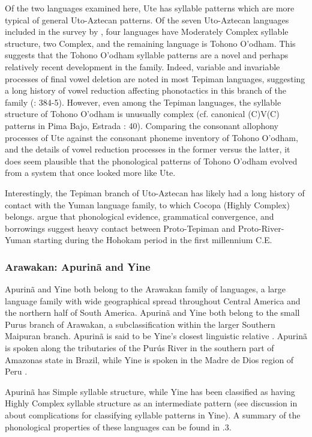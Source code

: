   Of the two languages examined here, Ute has syllable patterns which are more typical of general Uto-Aztecan patterns. Of the seven Uto-Aztecan languages included in the survey by \citet{Maddieson2013a}, four languages have Moderately Complex syllable structure, two Complex, and the remaining language is Tohono O’odham. This suggests that the Tohono O’odham syllable patterns are a novel and perhaps relatively recent development in the family. Indeed, variable and invariable processes of final vowel deletion are noted in most Tepiman languages, suggesting a long history of vowel reduction affecting phonotactics in this branch of the family (\citealt{ShaulHill1998}: 384-5). However, even among the Tepiman languages, the syllable structure of Tohono O’odham is unusually complex (cf. canonical (C)V(C) patterns in Pima Bajo, Estrada \citealt{Fernández2014}: 40). Comparing the consonant allophony processes of Ute against the consonant phoneme inventory of Tohono O’odham, and the details of vowel reduction processes in the former versus the latter, it does seem plausible that the phonological patterns of Tohono O’odham evolved from a system that once looked more like Ute.

  Interestingly, the Tepiman branch of Uto-Aztecan has likely had a long history of contact with the Yuman language family, to which Cocopa (Highly Complex) belongs. \citet{ShaulHill1998} argue that phonological evidence, grammatical convergence, and borrowings suggest heavy contact between Proto-Tepiman and Proto-River-Yuman starting during the Hohokam period in the first millennium C.E.

\subsubsection{{Arawakan:} {Apurinã} {and} {Yine}}\label{sec:8.4.3.2}

  Apurinã and Yine both belong to the Arawakan family of languages, a large language family with wide geographical spread throughout Central America and the northern half of South America. Apurinã and Yine both belong to the small Purus branch of Arawakan, a subclassification within the larger Southern Maipuran branch. Apurinã is said to be Yine’s closest linguistic relative \citep{Facundes2002}. Apurinã is spoken along the tributaries of the Purús River in the southern part of Amazonas state in Brazil, while Yine is spoken in the Madre de Dios region of Peru \citep{Aikhenvald1999}.

  Apurinã has Simple syllable structure, while Yine has been classified as having Highly Complex syllable structure as an intermediate pattern (see discussion in  about complications for classifying syllable patterns in Yine). A summary of the phonological properties of these languages can be found in .3.

